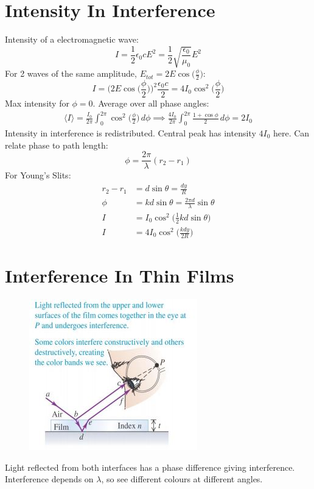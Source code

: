 \documentclass[a4paper, 11pt, normalem]{report}
\begin{document}
\section{Intensity In Interference}
Intensity of a electromagnetic wave:
\begin{equation}
    I = \frac{1}{2}\epsilon_{0}cE^{2} = \frac{1}{2}\sqrt{\frac{\epsilon_{0}}{\mu_{0}}}E^{2}
\end{equation}
For 2 waves of the same amplitude, $E_{tot} = 2E\cos{\Big(\frac{\phi}{2}\Big)}$:
\begin{equation}
    I = \Big(2E\cos{\Big(\frac{\phi}{2}\Big)}\Big)^{2} \frac{\epsilon_{0}c}{2} = 4I_{0}\cos^{2}{\Big(\frac{\phi}{2}\Big)}
\end{equation}
Max intensity for $\phi = 0$.
Average over all phase angles:
\begin{align}
    \langle I\rangle = \frac{I_{0}}{2\pi}\int_{0}^{2\pi}\cos^{2}{\Big(\frac{\phi}{2}\Big)}\, d\phi \implies \frac{4I_{0}}{2\pi}\int_{0}^{2\pi}\frac{1 + \cos{\phi}}{2}\, d\phi = 2I_{0}
\end{align}
Intensity in interference is redistributed.
Central peak has intensity $4I_{0}$ here.
Can relate phase to path length:
\begin{equation}
    \phi = \frac{2\pi}{\lambda}(r_{2} - r_{1})
\end{equation}
For Young's Slits:
\begin{align}
    r_{2} - r_{1} &= d\sin{\theta} = \frac{dy}{R} \\
    \phi &= kd\sin{\theta} = \frac{2\pi d}{\lambda}\sin{\theta} \\
    I &= I_{0}\cos^{2}{\Big(\frac{1}{2}kd\sin{\theta}\Big)} \\
    I &= 4I_{0}\cos^{2}{\Big(\frac{kdy}{2R}\Big)}
\end{align}

\section{Interference In Thin Films}
\begin{figure}[H]
    \centering
    \includegraphics{Film.jpg}
\end{figure}
Light reflected from both interfaces has a phase difference giving interference.
Interference depends on $\lambda$, so see different colours at different angles.
\end{document}
